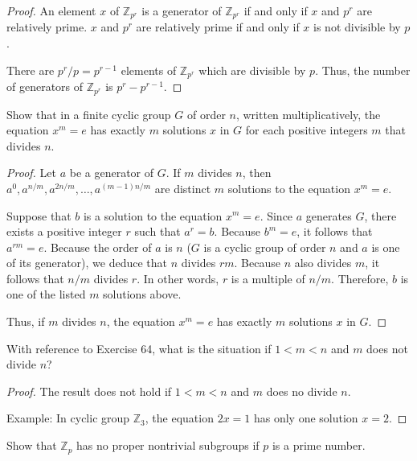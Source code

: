 \begin{proof}
    An element $x$ of $\mathbb{Z}_{{p}^{r}}$ is a generator of $\mathbb{Z}_{{p}^{r}}$ if and only if $x$ and $p^{r}$ are relatively prime. $x$ and $p^{r}$ are relatively prime if and only if $x$ is not divisible by $p$.

    There are $p^{r}/p = p^{r-1}$ elements of $\mathbb{Z}_{{p}^{r}}$ which are divisible by $p$. Thus, the number of generators of $\mathbb{Z}_{{p}^{r}}$ is $p^{r} - p^{r-1}$.
\end{proof}

\begin{exercise}
    Show that in a finite cyclic group $G$ of order $n$, written multiplicatively, the equation $x^{m} = e$ has exactly $m$ solutions $x$ in $G$ for each positive integers $m$ that divides $n$.
\end{exercise}

\begin{proof}
    Let $a$ be a generator of $G$. If $m$ divides $n$, then $a^{0}, a^{n/m}, a^{2n/m}, \ldots, a^{(m-1)n/m}$ are distinct $m$ solutions to the equation $x^{m} = e$.

    Suppose that $b$ is a solution to the equation $x^{m} = e$. Since $a$ generates $G$, there exists a positive integer $r$ such that $a^{r} = b$. Because $b^{m} = e$, it follows that $a^{rm} = e$. Because the order of $a$ is $n$ ($G$ is a cyclic group of order $n$ and $a$ is one of its generator), we deduce that $n$ divides $rm$. Because $n$ also divides $m$, it follows that $n/m$ divides $r$. In other words, $r$ is a multiple of $n/m$. Therefore, $b$ is one of the listed $m$ solutions above.

    Thus, if $m$ divides $n$, the equation $x^{m} = e$ has exactly $m$ solutions $x$ in $G$.
\end{proof}

\begin{exercise}
    With reference to Exercise 64, what is the situation if $1 < m < n$ and $m$ does not divide $n$?
\end{exercise}

\begin{proof}
    The result does not hold if $1 < m < n$ and $m$ does no divide $n$.

    Example: In cyclic group $\mathbb{Z}_{3}$, the equation $2x = 1$ has only one solution $x = 2$.
\end{proof}

\begin{exercise}
    Show that $\mathbb{Z}_{p}$ has no proper nontrivial subgroups if $p$ is a prime number.
\end{exercise}

